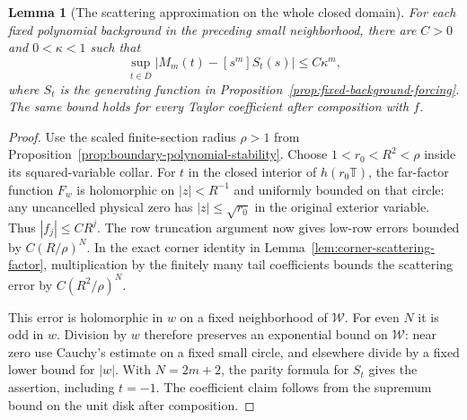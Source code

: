 \documentclass[11pt]{article}
\newtheorem{lemma}[proposition]{Lemma}
\newcommand{\T}{\mathbb T}
\begin{document}
\begin{lemma}[The scattering approximation on the whole closed domain]
\label{lem:closed-domain-scattering}
For each fixed polynomial background in the preceding small
neighborhood, there are $C>0$ and $0<\kappa<1$ such that
\[
 \sup_{t\in\overline D}|M_m(t)-[s^m]S_t(s)|\le C\kappa^m,
\]
where $S_t$ is the generating function in
Proposition~\ref{prop:fixed-background-forcing}. The same bound
holds for every Taylor coefficient after composition with $f$.
\end{lemma}
\begin{proof}
Use the scaled finite-section radius $\rho>1$ from
Proposition~\ref{prop:boundary-polynomial-stability}.
Choose $1<r_0<R^2<\rho$ inside its squared-variable collar.
For $t$ in the closed interior of $h(r_0\T)$, the far-factor
function $F_w$ is holomorphic on $|z|<R^{-1}$ and uniformly bounded
on that circle: any uncancelled physical zero has $|z|\le\sqrt{r_0}$
in the original exterior variable. Thus $|f_j|\le CR^j$.
The row truncation argument now gives low-row errors bounded by
$C(R/\rho)^N$. In the exact corner identity in
Lemma~\ref{lem:corner-scattering-factor}, multiplication by the
finitely many tail coefficients bounds the scattering error by
$C(R^2/\rho)^N$.

This error is holomorphic in $w$ on a fixed neighborhood of
$\mathcal W$. For even $N$ it is odd in $w$. Division by $w$
therefore preserves an exponential bound on $\mathcal W$: near zero
use Cauchy's estimate on a fixed small circle, and elsewhere divide
by a fixed lower bound for $|w|$. With $N=2m+2$, the parity formula
for $S_t$ gives the assertion, including $t=-1$. The coefficient
claim follows from the supremum bound on the unit disk after composition.
\end{proof}
\end{document}
